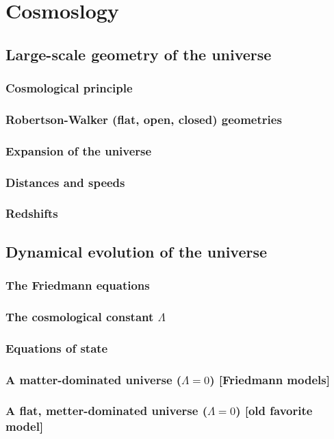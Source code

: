 \documentclass{article}
\theoremstyle{definition}
\begin{document}
\newpage

\section{Cosmoslogy}
\subsection{Large-scale geometry of the universe}
\subsubsection{Cosmological principle}
\subsubsection{Robertson-Walker (flat, open, closed) geometries}
\subsubsection{Expansion of the universe}
\subsubsection{Distances and speeds}
\subsubsection{Redshifts}
\subsection{Dynamical evolution of the universe}
\subsubsection{The Friedmann equations}
\subsubsection{The cosmological constant $\Lambda$}
\subsubsection{Equations of state}
\subsubsection{A matter-dominated universe ($\Lambda = 0$) [Friedmann models]}
\subsubsection{A flat, metter-dominated universe ($\Lambda = 0$) [old favorite model]}
\end{document}
